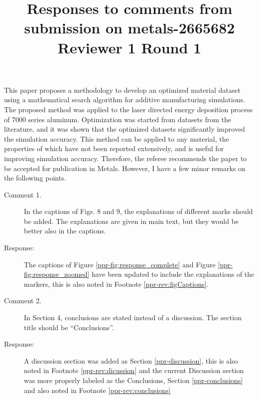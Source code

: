 \documentclass{article}
\begin{document}
\title{Responses to comments from submission on metals-2665682\\Reviewer 1 Round 1}
\date{}

\maketitle

This paper proposes a methodology to develop an optimized material dataset using a mathematical search algorithm for additive manufacturing simulations. The proposed method was applied to the laser directed energy deposition process of 7000 series aluminum. Optimization was started from datasets from the literature, and it was shown that the optimized datasets significantly improved the simulation accuracy. This method can be applied to any material, the properties of which have not been reported extensively, and is useful for improving simulation accuracy. Therefore, the referee recommends the paper to be accepted for publication in Metals. However, I have a few minor remarks on the following points.
\begin{description}
	\item[Comment 1.] In the captions of Figs. 8 and 9, the explanations of different marks should be added. The explanations are given in main text, but they would be better also in the captions.
 	\item[Response:] The captions of Figure \ref{ppr-fig:response_complete} and Figure \ref{ppr-fig:response_zoomed} have been updated to include the explanations of the markers, this is also noted in Footnote \ref{ppr-rev:figCaptions}.
	\item[Comment 2.] In Section 4, conclusions are stated instead of a discussion. The section title should be ``Conclusions''.
 	\item[Response:] A discussion section was added as Section \ref{ppr-discussion}, this is also noted in Footnote \ref{ppr-rev:dicussion} and the current Discussion section was more properly labeled as the Conclusions, Section \ref{ppr-conclusions} and also noted in Footnote \ref{ppr-rev:conclusions}
\end{description}
\end{document}
